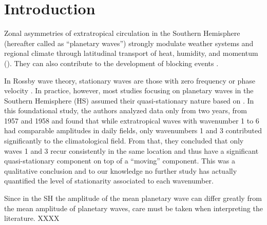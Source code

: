 \documentclass[draft,linenumbers]{agujournal2018}
\begin{document}
\vskip18pt
\section{Introduction}

Zonal asymmetries of extratropical circulation in the Southern
Hemisphere (hereafter called as ``planetary waves'') strongly modulate
weather systems and regional climate through latitudinal transport of
heat, humidity, and momentum (\citet{trenberth1980a}). They can also
contribute to the development of blocking events
\citep[e.g.~][]{trenberth1985}.

In Rossby wave theory, stationary waves are those with zero frequency or
phase velocity \citep{holton2012}. In practice, however, most studies
focusing on planetary waves in the Southern Hemisphere (HS) assumed
their quasi-stationary nature based on \citet{vanloon1972}. In this
foundational study, the authors analyzed data only from two years, from
1957 and 1958 and found that while extratropical waves with wavenumber 1
to 6 had comparable amplitudes in daily fields, only wavenumbers 1 and 3
contributed significantly to the climatological field. From that, they
concluded that only waves 1 and 3 recur consistently in the same
location and thus have a significant quasi-stationary component on top
of a ``moving'' component. This was a qualitative conclusion and to our
knowledge no further study has actually quantified the level of
stationarity associated to each wavenumber.

Since in the SH the amplitude of the mean planetary wave can differ
greatly from the mean amplitude of planetary waves, care must be taken
when interpreting the literature. XXXX
\end{document}
